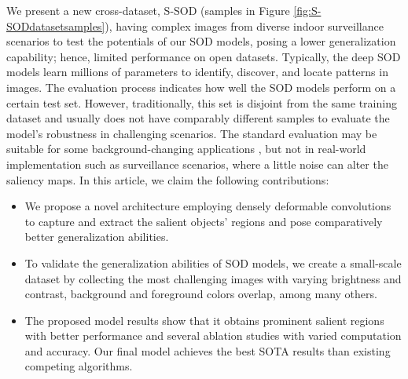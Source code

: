 \documentclass{article}
\begin{document}
We present a new cross-dataset, S-SOD (samples in Figure \ref{fig:S-SODdatasetsamples}), having complex images from diverse indoor surveillance scenarios to test the potentials of our SOD models, posing a lower generalization capability; hence, limited performance on open datasets. Typically, the deep SOD models learn millions of parameters to identify, discover, and locate patterns in images. The evaluation process indicates how well the SOD models perform on a certain test set. However, traditionally, this set is disjoint from the same training dataset and usually does not have comparably different samples to evaluate the model's robustness in challenging scenarios. The standard evaluation may be suitable for some background-changing applications \cite{fan2020rethinking}, but not in real-world implementation such as surveillance scenarios, where a little noise can alter the saliency maps.
In this article, we claim the following contributions:
\begin{itemize}

\item We propose a novel architecture employing densely deformable convolutions to capture and extract the salient objects' regions and pose comparatively better generalization abilities.

\item To validate the generalization abilities of SOD models, we create a small-scale dataset by collecting the most challenging images with varying brightness and contrast, background and foreground colors overlap, among many others.

\item The proposed model results show that it obtains prominent salient regions with better performance and several ablation studies with varied computation and accuracy.  Our final model achieves the best SOTA results than existing competing algorithms.

\end{itemize}
\end{document}
